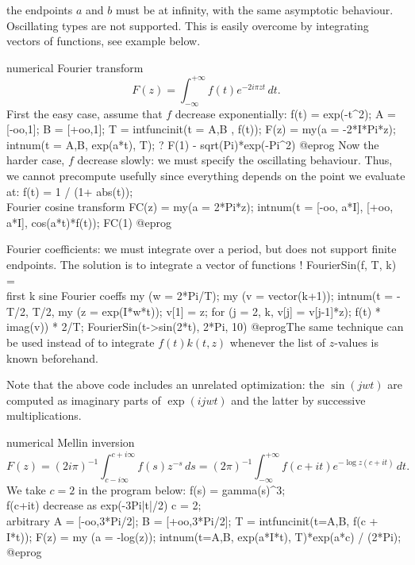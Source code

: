  the endpoints $a$ and $b$ must be at infinity,
with the same asymptotic behaviour. Oscillating types are not supported.
This is easily overcome by integrating vectors of functions, see example
below.


\item numerical Fourier transform
$$F(z) = \int_{-\infty}^{+\infty} f(t)e^{-2i\pi z t}\, dt. $$
First the easy case, assume that $f$ decrease exponentially:
\bprog
   f(t) = exp(-t^2);
   A = [-oo,1];
   B = [+oo,1];
   T = intfuncinit(t = A,B , f(t));
   F(z) =
   { my(a = -2*I*Pi*z);
     intnum(t = A,B, exp(a*t), T);
   }
   ? F(1) - sqrt(Pi)*exp(-Pi^2)
@eprog\noindent
Now the harder case, $f$ decrease slowly: we must specify the oscillating
behaviour. Thus, we cannot precompute usefully since everything depends on
the point we evaluate at:
\bprog
   f(t) = 1 / (1+ abs(t));
   \\ Fourier cosine transform
   FC(z) =
   { my(a = 2*Pi*z);
     intnum(t = [-oo, a*I], [+oo, a*I], cos(a*t)*f(t));
   }
   FC(1)
@eprog
\item Fourier coefficients: we must integrate over a period, but
 does not support finite endpoints.
The solution is to integrate a vector of functions !
\bprog
FourierSin(f, T, k) =  \\ first k sine Fourier coeffs
{
  my (w = 2*Pi/T);
  my (v = vector(k+1));
  intnum(t = -T/2, T/2,
     my (z = exp(I*w*t));
     v[1] = z;
     for (j = 2, k, v[j] = v[j-1]*z);
     f(t) * imag(v)) * 2/T;
}
FourierSin(t->sin(2*t), 2*Pi, 10)
@eprog\noindent The same technique can be used instead of 
to integrate $f(t) k(t,z)$ whenever the list of $z$-values is known
beforehand.

Note that the above code includes an unrelated optimization: the
$\sin(j w t)$ are computed as imaginary parts of $\exp(i j w t)$ and the
latter by successive multiplications.

\item numerical Mellin inversion
$$F(z) = (2i\pi)^{-1} \int_{c -i\infty}^{c+i\infty} f(s)z^{-s}\, ds
 = (2\pi)^{-1} \int_{-\infty}^{+\infty}
    f(c + i t)e^{-\log z(c + it)}\, dt. $$
We take $c = 2$ in the program below:
\bprog
   f(s) = gamma(s)^3;  \\ f(c+it) decrease as exp(-3Pi|t|/2)
   c = 2; \\ arbitrary
   A = [-oo,3*Pi/2];
   B = [+oo,3*Pi/2];
   T = intfuncinit(t=A,B, f(c + I*t));
   F(z) =
   { my (a = -log(z));
     intnum(t=A,B, exp(a*I*t), T)*exp(a*c) / (2*Pi);
   }
@eprog

